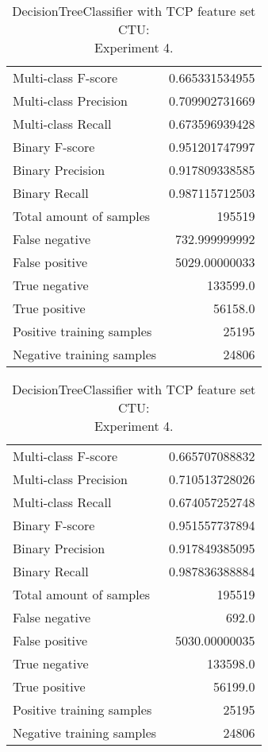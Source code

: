 \begin{table}[H]
\begin{minipage}{0.5\textwidth}
\caption{DecisionTreeClassifier with TCP feature set CTU: \\Experiment 3.}
\centering
\begin{tabular}{l r}
\toprule
Multi-class F-score & 0.665331534955 \\
Multi-class Precision & 0.709902731669 \\
Multi-class Recall & 0.673596939428 \\
\midrule
Binary F-score & 0.951201747997 \\
Binary Precision & 0.917809338585 \\
Binary Recall & 0.987115712503 \\
\midrule
Total amount of samples & 195519 \\
False negative & 732.999999992 \\
False positive & 5029.00000033 \\
True negative & 133599.0 \\
True positive & 56158.0 \\
\midrule
Positive training samples & 25195 \\
Negative training samples & 24806 \\
\bottomrule
\end{tabular}
\end{minipage}
\hfillx
\begin{minipage}{0.5\textwidth}
\caption{DecisionTreeClassifier with TCP feature set CTU: \\Experiment 4.}
\centering
\begin{tabular}{l r}
\toprule
Multi-class F-score & 0.665707088832 \\
Multi-class Precision & 0.710513728026 \\
Multi-class Recall & 0.674057252748 \\
\midrule
Binary F-score & 0.951557737894 \\
Binary Precision & 0.917849385095 \\
Binary Recall & 0.987836388884 \\
\midrule
Total amount of samples & 195519 \\
False negative & 692.0 \\
False positive & 5030.00000035 \\
True negative & 133598.0 \\
True positive & 56199.0 \\
\midrule
Positive training samples & 25195 \\
Negative training samples & 24806 \\
\bottomrule
\end{tabular}
\end{minipage}
\end{table}
